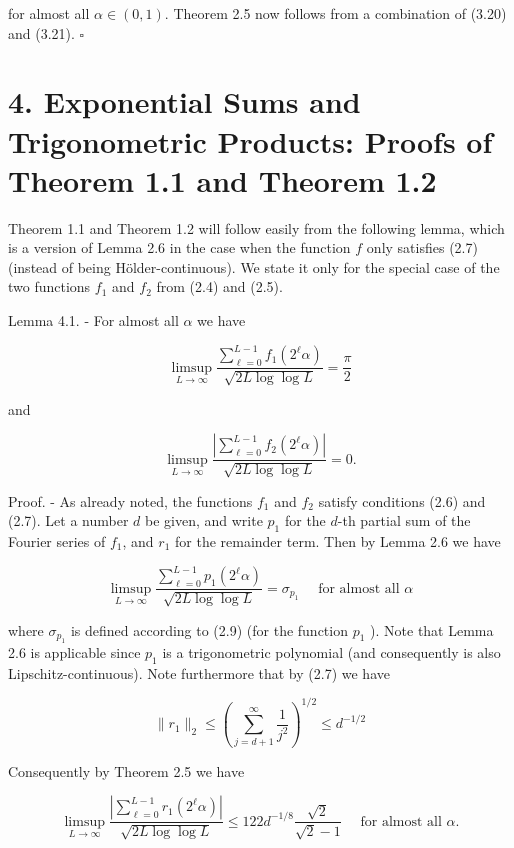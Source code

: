 \documentclass[10pt]{article}
\newcommand{\1}{\mathbf{1}}
\begin{document}
for almost all $\alpha \in(0,1)$. Theorem 2.5 now follows from a combination of (3.20) and (3.21). \(\square\)

\section*{4. Exponential Sums and Trigonometric Products: Proofs of Theorem 1.1 and Theorem 1.2}
Theorem 1.1 and Theorem 1.2 will follow easily from the following lemma, which is a version of Lemma 2.6 in the case when the function $f$ only satisfies (2.7) (instead of being Hölder-continuous). We state it only for the special case of the two functions $f_{1}$ and $f_{2}$ from (2.4) and (2.5).

Lemma 4.1. - For almost all $\alpha$ we have

$$
\limsup _{L \rightarrow \infty} \frac{\sum_{\ell=0}^{L-1} f_{1}\left(2^{\ell} \alpha\right)}{\sqrt{2 L \log \log L}}=\frac{\pi}{2}
$$

and

$$
\limsup _{L \rightarrow \infty} \frac{\left|\sum_{\ell=0}^{L-1} f_{2}\left(2^{\ell} \alpha\right)\right|}{\sqrt{2 L \log \log L}}=0 .
$$

Proof. - As already noted, the functions $f_{1}$ and $f_{2}$ satisfy conditions (2.6) and (2.7). Let a number $d$ be given, and write $p_{1}$ for the $d$-th partial sum of the Fourier series of $f_{1}$, and $r_{1}$ for the remainder term. Then by Lemma 2.6 we have


\begin{equation*}
\limsup _{L \rightarrow \infty} \frac{\sum_{\ell=0}^{L-1} p_{1}\left(2^{\ell} \alpha\right)}{\sqrt{2 L \log \log L}}=\sigma_{p_{1}} \quad \text { for almost all } \alpha \tag{4.1}
\end{equation*}


where $\sigma_{p_{1}}$ is defined according to (2.9) (for the function $p_{1}$ ). Note that Lemma 2.6 is applicable since $p_1$ is a trigonometric polynomial (and consequently is also Lipschitz-continuous). Note furthermore that by (2.7) we have

$$
\|r_1\|_2\leqslant\left(\sum_{j=d+1}^{\infty}\frac1{j^2}\right)^{1/2}\leqslant d^{-1/2}
$$

Consequently by Theorem 2.5 we have


\begin{equation*}
\limsup _{L \rightarrow \infty} \frac{\left|\sum_{\ell=0}^{L-1} r_{1}\left(2^{\ell} \alpha\right)\right|}{\sqrt{2 L \log \log L}} \leqslant 122 d^{-1 / 8} \frac{\sqrt{2}}{\sqrt{2}-1} \quad \text { for almost all } \alpha . \tag{4.2}
\end{equation*}
\end{document}
